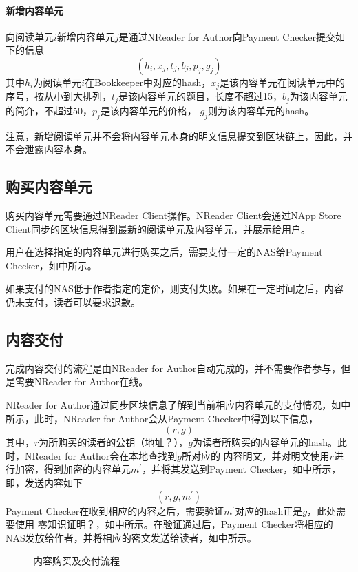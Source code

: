 \paragraph{新增内容单元}
向阅读单元\(i\)新增内容单元\(j\)是通过NReader for Author向Payment Checker提交如下的信息
\[(h_i, x_j, t_j, b_j, p_j, g_j )\]
\noindent 其中\(h_i\)为阅读单元\(i\)在Bookkeeper中对应的hash，\(x_j\)是该内容单元在阅读单元中的序号，按从小到大排列，\(t_j\)是该内容单元的题目，长度不超过15，\(b_j\)为该内容单元的简介，不超过50，\(p_j\)是该内容单元的价格，
\(g_j\)则为该内容单元的hash。

注意，新增阅读单元并不会将内容单元本身的明文信息提交到区块链上，因此，并不会泄露内容本身。

\subsection{购买内容单元}
购买内容单元需要通过NReader Client操作。NReader Client会通过NApp Store Client同步的区块信息得到最新的阅读单元及内容单元，并展示给用户。

用户在选择指定的内容单元进行购买之后，需要支付一定的NAS给Payment Checker，如中所示。

如果支付的NAS低于作者指定的定价，则支付失败。如果在一定时间之后，内容仍未支付，读者可以要求退款。

\subsection{内容交付}
完成内容交付的流程是由NReader for Author自动完成的，并不需要作者参与，但是需要NReader for Author在线。

NReader for Author通过同步区块信息了解到当前相应内容单元的支付情况，如中所示，此时，NReader for Author会从Payment Checker中得到以下信息，
\[(r, g)\]
\noindent 其中，\(r\)为所购买的读者的公钥（地址？），\(g\)为读者所购买的内容单元的hash。此时，NReader for Author会在本地查找到\(g\)所对应的
内容明文，并对明文使用\(r\)进行加密，得到加密的内容单元\(m^{\prime}\)，并将其发送到Payment Checker，如中所示，即，发送内容如下
\[(r, g, m^{\prime})\]
Payment Checker在收到相应的内容之后，需要验证\(m^{\prime}\)对应的hash正是\(g\)，此处需要使用{\color{red} 零知识证明？}，如中所示。在验证通过后，Payment Checker将相应的NAS发放给作者，并将相应的密文发送给读者，如中所示。

\begin{figure}
\centering

\caption{内容购买及交付流程}
\label{fig:buy}
\end{figure}